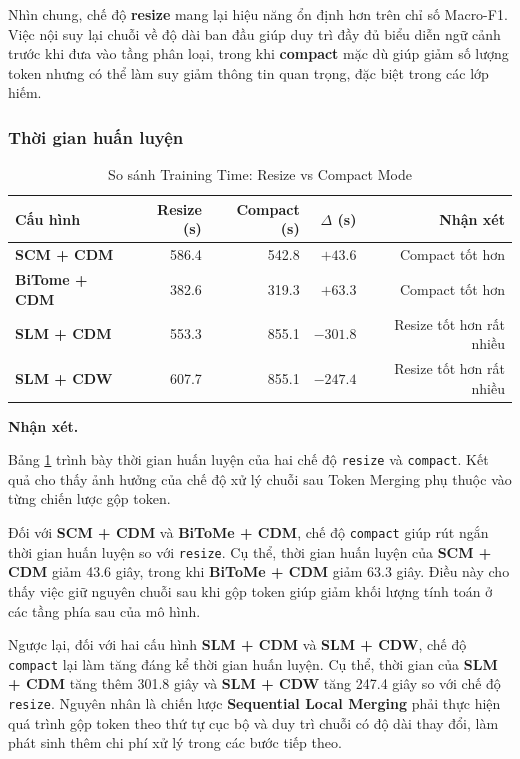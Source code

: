 Nhìn chung, chế độ \textbf{resize} mang lại hiệu năng ổn định hơn
trên chỉ số Macro-F1. Việc nội suy lại chuỗi về độ dài ban đầu giúp
duy trì đầy đủ biểu diễn ngữ cảnh trước khi đưa vào tầng phân loại,
trong khi \textbf{compact} mặc dù giúp giảm số lượng token nhưng có
thể làm suy giảm thông tin quan trọng, đặc biệt trong các lớp hiếm.

\subsubsection*{Thời gian huấn luyện}

\begin{table}[H]
\centering
\small
\caption{So sánh Training Time: Resize vs Compact Mode}
\label{tab:compact_vs_resize_micro}
\begin{tabular}{@{}lrrrr@{}}
\toprule
\textbf{Cấu hình} & \textbf{Resize (s)} & \textbf{Compact (s)} & \textbf{$\Delta$ (s)} & \textbf{Nhận xét} \\
\midrule
\textbf{SCM + CDM}  & 586.4 & 542.8 & $+43.6$ & Compact tốt hơn \\
\textbf{BiTome + CDM}   & 382.6 & 319.3 & $+63.3$ & Compact tốt hơn  \\
\textbf{SLM + CDM}   & 553.3 & 855.1 & $-301.8$ & Resize tốt hơn rất nhiều \\
\textbf{SLM + CDW}   & 607.7 & 855.1 & $-247.4$ & Resize tốt hơn rất nhiều \\
\midrule
\bottomrule
\end{tabular}
\end{table}

\textbf{Nhận xét.}

Bảng \ref{tab:compact_vs_resize_micro} trình bày thời gian huấn luyện của
hai chế độ \texttt{resize} và \texttt{compact}. Kết quả cho thấy ảnh
hưởng của chế độ xử lý chuỗi sau Token Merging phụ thuộc vào từng chiến
lược gộp token.

Đối với \textbf{SCM + CDM} và
\textbf{BiToMe + CDM}, chế độ \texttt{compact} giúp rút ngắn thời
gian huấn luyện so với \texttt{resize}. Cụ thể, thời gian huấn luyện của
\textbf{SCM + CDM} giảm 43.6 giây, trong khi
\textbf{BiToMe + CDM} giảm 63.3 giây. Điều này cho thấy việc giữ nguyên
chuỗi sau khi gộp token giúp giảm khối lượng tính toán ở các tầng phía
sau của mô hình.

Ngược lại, đối với hai cấu hình \textbf{SLM + CDM} và
\textbf{SLM + CDW}, chế
độ \texttt{compact} lại làm tăng đáng kể thời gian huấn luyện.
Cụ thể, thời gian của \textbf{SLM + CDM} tăng thêm 301.8 giây và
\textbf{SLM + CDW} tăng 247.4 giây so với chế độ
\texttt{resize}. Nguyên nhân là chiến lược
\textbf{Sequential Local Merging}
phải thực hiện quá trình gộp token theo thứ tự cục bộ và duy trì chuỗi
có độ dài thay đổi, làm phát sinh thêm chi phí xử lý trong các bước
tiếp theo.

